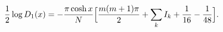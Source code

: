 \begin{equation}
\frac{1}{2}\log{D_1(x)}
= -\frac{\pi\cosh{x}}{N}
\Bigl[ \frac{m(m+1)\pi}{2} + \sum_{k} I_k + \frac{1}{16} - \frac{1}{48}\Bigr].
\end{equation}

